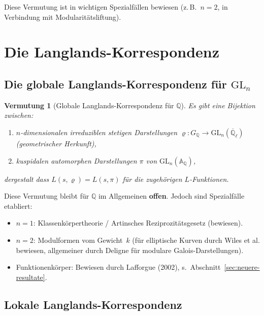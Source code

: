 \documentclass[a4paper,12pt]{amsart}
\newtheorem{conjecture}[theorem]{Vermutung}
\theoremstyle{definition}
\theoremstyle{remark}
\newcommand{\Q}{\mathbb{Q}}
\newcommand{\GL}{\mathrm{GL}}
\begin{document}
Diese Vermutung ist in wichtigen Spezialfällen bewiesen (z.\,B.\ $n = 2$, in
Verbindung mit Modularitätsliftung).

\section{Die Langlands-Korrespondenz}
\label{sec:langlands}

\subsection{Die globale Langlands-Korrespondenz für $\GL_n$}

\begin{conjecture}[Globale Langlands-Korrespondenz für $\Q$]
\label{verm:langlands}
Es gibt eine Bijektion zwischen:
\begin{enumerate}[label=(\roman*)]
\item $n$-dimensionalen irreduziblen stetigen Darstellungen
  $\varrho\colon G_\Q \to \GL_n(\overline{\Q}_\ell)$ (geometrischer Herkunft),
\item kuspidalen automorphen Darstellungen $\pi$ von $\GL_n(\mathbb{A}_\Q)$,
\end{enumerate}
dergestalt dass $L(s, \varrho) = L(s, \pi)$ für die zugehörigen $L$-Funktionen.
\end{conjecture}

Diese Vermutung bleibt für $\Q$ im Allgemeinen \textbf{offen}. Jedoch sind
Spezialfälle etabliert:
\begin{itemize}
\item $n = 1$: Klassenkörpertheorie / Artinsches Reziprozitätsgesetz (bewiesen).
\item $n = 2$: Modulformen vom Gewicht~$k$ (für elliptische Kurven durch Wiles et al.
  bewiesen, allgemeiner durch Deligne für modulare Galois-Darstellungen).
\item Funktionenkörper: Bewiesen durch Lafforgue (2002), s.\ Abschnitt~\ref{sec:neuere-resultate}.
\end{itemize}

\subsection{Lokale Langlands-Korrespondenz}
\end{document}
